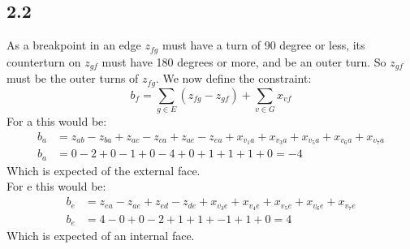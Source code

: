 \subsection*{2.2}%
As a breakpoint in an edge $z_{fg}$ must have a turn of 90 degree or less, its counterturn on $z_{gf}$ must have 180 degrees or more, and be an outer turn. 
So $z_{gf}$ must be the outer turns of $z_{fg}$.
We now define the constraint:
\begin{equation}
    b_f = \sum_{g \in E}(z_{fg} - z_{gf})  + \sum_{v \in G} x_{vf}
\end{equation} 
For a this would be: 
\begin{align*}
    b_a &= z_{ab} - z_{ba} + z_{ac} - z_{ca} + z_{ae} - z_{ea} + x_{v_1a} + x_{v_3a} + x_{v_5a} + x_{v_6a} + x_{v_7a}\\
    b_a &= 0 - 2 + 0 - 1 + 0 - 4 + 0 + 1 + 1 + 1 + 0 = -4
\end{align*} 
Which is expected of the external face.\\
For e this would be:
\begin{align*}
    b_e &= z_{ea} - z_{ae} + z_{ed} - z_{de} + x_{v_3e} + x_{v_4e} + x_{v_5e} + x_{v_6e} + x_{v_7e}\\
    b_e &= 4      - 0      + 0      - 2      + 1        + 1        + -1       + 1        + 0 = 4
\end{align*} 
Which is expected of an internal face.
